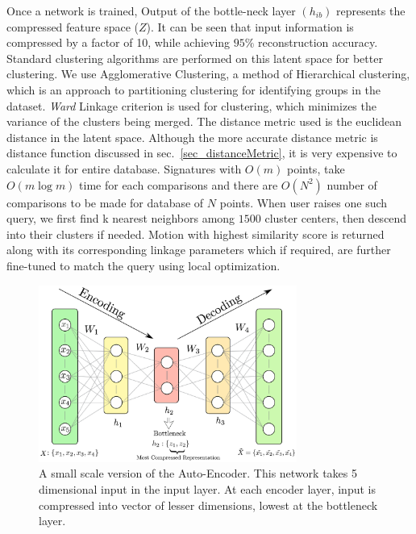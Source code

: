 \documentclass[twocolumn,10pt]{asme2e}
\begin{document}
Once a network is trained, Output of the bottle-neck layer $(h_{ib})$ represents the compressed feature space ($Z$).
It can be seen that input information is compressed by a factor of 10, while achieving $95\%$ reconstruction accuracy.
Standard clustering algorithms are performed on this latent space for better clustering\cite{song2013}.
We use Agglomerative Clustering, a method of Hierarchical clustering, which is an approach to partitioning clustering for identifying groups in the dataset.
\emph{Ward}\cite{ward1963} Linkage criterion is used for clustering, which minimizes the variance of the clusters being merged.
The distance metric used is the euclidean distance in the latent space.
Although the more accurate distance metric is distance function discussed in sec.~\ref{sec_distanceMetric}, it is very expensive to calculate it for entire database.
Signatures with ${O}(m)$ points, take ${O}(m\log{}m)$ time for each comparisons and there are ${O}(N^2)$ number of comparisons to be made for database of $N$ points.
When user raises one such query, we first find k nearest neighbors among $1500$ cluster centers, then descend into their clusters if needed.
Motion with highest similarity score is returned along with its corresponding linkage parameters which if required, are further fine-tuned to match the query using local optimization.

\begin{figure}
\centering
\includegraphics[width=240pt]{figure/fig_auto_encoder.eps}
  \caption{A small scale version of the Auto-Encoder. This network takes 5 dimensional input in the input layer. At each encoder layer, input is compressed into vector of lesser dimensions, lowest at the bottleneck layer.}
\label{autoEncoder}
\end{figure}
\end{document}
